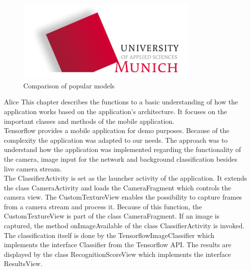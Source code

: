 \begin{figure}[htbp]
\includegraphics[width=0.8\textwidth]{includes/MUASlogo}
\caption[Comparison of popular models]{Comparison of popular models \citep{TensorFlowMobileNet}}
\label{fig:FH-Logo8}
\end{figure} 

	 Alice
This chapter describes the functions to a basic understanding of how the application works based on the application's architecture. It focuses on the important classes and methods of the mobile application. \\
Tensorflow provides a mobile application for demo purposes. Because of the complexity the application was adapted to our needs. The approach was to understand how the application was implemented regarding the functionality of the camera, image input for the network and background classification besides live camera stream. \\

The ClassifierActivity is set as the launcher activity of the application. It extends the class CameraActivity and loads the CameraFragment which controls the camera view. The CustomTextureView enables the possibility to capture frames from a camera stream and process it. Because of this function, the CustomTextureView is part of the class CameraFragment. If an image is captured, the method onImageAvailable of the class ClassifierActivity is invoked. The classification itself is done by the TensorflowImageClassifier which implements the interface Classifier from the Tensorflow API. The results are displayed by the class RecognitionScoreView which implements the interface ResultsView.